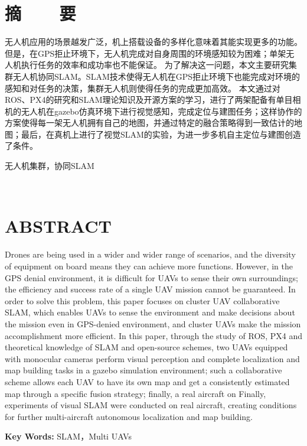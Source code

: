 

\renewcommand{\baselinestretch}{1.5}
\fontsize{12pt}{13pt} \selectfont

\chapter*{摘~~~~要}

\vspace{1em}


无人机应用的场景越发广泛，机上搭载设备的多样化意味着其能实现更多的功能。
但是，在GPS拒止环境下，无人机完成对自身周围的环境感知较为困难；单架无人机执行任务的效率和成功率也不能保证。
为了解决这一问题，本文主要研究集群无人机协同SLAM。SLAM技术使得无人机在GPS拒止环境下也能完成对环境的感知和对任务的决策，集群无人机则使得任务的完成更加高效。
本文通过对ROS、PX4的研究和SLAM理论知识及开源方案的学习，进行了两架配备有单目相机的无人机在gazebo仿真环境下进行视觉感知，完成定位与建图任务；这样协作的方案使得每一架无人机拥有自己的地图，并通过特定的融合策略得到一致估计的地图；最后，在真机上进行了视觉SLAM的实验，为进一步多机自主定位与建图创造了条件。

\vspace{0.1in}
 无人机集群，协同SLAM


﻿﻿


\chapter*{ABSTRACT}
\noindent 
\vspace{1em}

Drones are being used in a wider and wider range of scenarios, and the diversity of equipment on board means they can achieve more functions.
However, in the GPS denial environment, it is difficult for UAVs to sense their own surroundings; the efficiency and success rate of a single UAV mission cannot be guaranteed.
In order to solve this problem, this paper focuses on cluster UAV collaborative SLAM, which enables UAVs to sense the environment and make decisions about the mission even in GPS-denied environment, and cluster UAVs make the mission accomplishment more efficient.
In this paper, through the study of ROS, PX4 and theoretical knowledge of SLAM and open-source schemes, two UAVs equipped with monocular cameras perform visual perception and complete localization and map building tasks in a gazebo simulation environment; such a collaborative scheme allows each UAV to have its own map and get a consistently estimated map through a specific fusion strategy; finally, a real aircraft on Finally, experiments of visual SLAM were conducted on real aircraft, creating conditions for further multi-aircraft autonomous localization and map building.


\vspace{0.1in}
\noindent \textbf{Key Words:} SLAM，Multi UAVs
